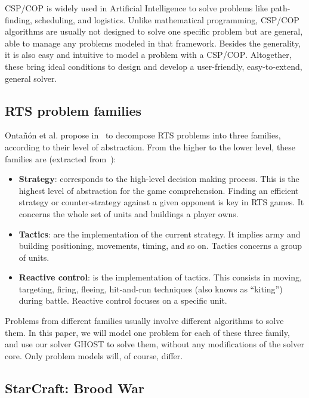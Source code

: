 \documentclass{article}
\newcommand{\csp}{\textsc{CSP}\xspace}
\newcommand{\cop}{\textsc{COP}\xspace}
\newcommand{\ghost}{\textsc{GHOST}\xspace}
\begin{document}
\csp/\cop is widely used in  Artificial Intelligence to solve problems
like  path-finding, scheduling,  and  logistics.  Unlike  mathematical
programming, \csp/\cop  algorithms are  usually not designed  to solve
one  specific problem  but are  general, able  to manage  any problems
modeled in that framework. Besides the generality, it is also easy and
intuitive  to model  a problem  with a  \csp/\cop.  Altogether,  these
bring  ideal  conditions  to   design  and  develop  a  user-friendly,
easy-to-extend, general solver.



\subsection{RTS problem families}

Onta{\~n}{\'o}n et  al. propose in~\cite{OntanonSURCM13}  to decompose
RTS  problems  into  three  families,  according  to  their  level  of
abstraction. From  the higher to  the lower level, these  families are
(extracted from~\cite{OntanonSURCM13}):
\begin{itemize}
\item {\bf  Strategy}: corresponds  to the high-level  decision making
  process.   This is  the highest  level of  abstraction for  the game
  comprehension.   Finding an  efficient strategy  or counter-strategy
  against a given opponent is key  in RTS games. It concerns the whole
  set of units and buildings a player owns.
\item {\bf Tactics}:  are the implementation of  the current strategy.
  It implies army and building  positioning, movements, timing, and so
  on. Tactics concerns a group of units.
\item {\bf Reactive  control}: is the implementation  of tactics. This
  consists   in  moving,   targeting,  firing,   fleeing,  hit-and-run
  techniques  (also  knows  as ``kiting'')  during  battle.   Reactive
  control focuses on a specific unit.
\end{itemize}
Problems from different families  usually involve different algorithms
to solve them.  In  this paper, we will model one  problem for each of
these three family,  and use our solver \ghost to  solve them, without
any modifications  of the  solver core. Only  problem models  will, of
course, differ.

\subsection{StarCraft: Brood War}
\end{document}
